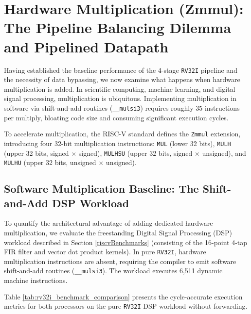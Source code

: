 \section{Hardware Multiplication (Zmmul): The Pipeline Balancing Dilemma and Pipelined Datapath}\label{riscvHardwareMultiplier}\label{riscvZmmulCaseStudy}\label{riscvPipelinedMultiplier}

Having established the baseline performance of the 4-stage \texttt{RV32I} pipeline and the necessity of data bypassing, we now examine what happens when hardware multiplication is added. In scientific computing, machine learning, and digital signal processing, multiplication is ubiquitous. Implementing multiplication in software via shift-and-add routines (\texttt{\_\_mulsi3}) requires roughly 35 instructions per multiply, bloating code size and consuming significant execution cycles. 

To accelerate multiplication, the RISC-V standard defines the \texttt{Zmmul} extension, introducing four 32-bit multiplication instructions: \texttt{MUL} (lower 32 bits), \texttt{MULH} (upper 32 bits, signed $\times$ signed), \texttt{MULHSU} (upper 32 bits, signed $\times$ unsigned), and \texttt{MULHU} (upper 32 bits, unsigned $\times$ unsigned).

\subsection{Software Multiplication Baseline: The Shift-and-Add DSP Workload}

To quantify the architectural advantage of adding dedicated hardware multiplication, we evaluate the freestanding Digital Signal Processing (DSP) workload described in Section \ref{riscvBenchmarks} (consisting of the 16-point 4-tap FIR filter and vector dot product kernels). In pure \texttt{RV32I}, hardware multiplication instructions are absent, requiring the compiler to emit software shift-and-add routines (\texttt{\_\_mulsi3}). The workload executes 6,511 dynamic machine instructions.

Table \ref{tab:rv32i_benchmark_comparison} presents the cycle-accurate execution metrics for both processors on the pure \texttt{RV32I} DSP workload without forwarding.

